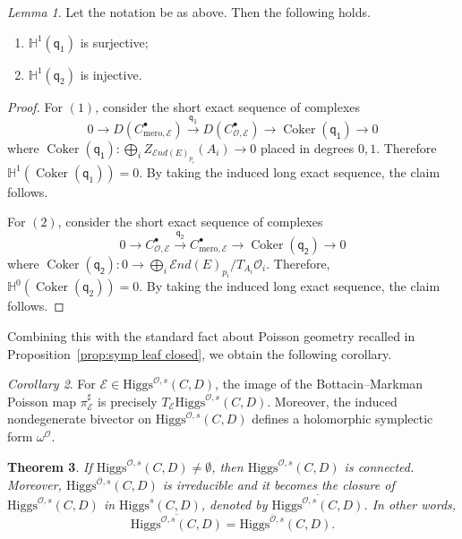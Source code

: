 \documentclass[11pt]{amsart}
\theoremstyle{plain}
\newtheorem{theorem}{Theorem}[section]
\theoremstyle{definition}
\theoremstyle{remark}
\newtheorem{lem}[theorem]{Lemma}
\newtheorem{corollary}[theorem]{Corollary}
\newcommand{\End}{\mathcal E nd}
\newcommand{\Coker}{\operatorname{Coker}}
\newcommand{\HH}{\mathbb H}
\newcommand{\ov}[1]{\overline{#1}}
\newcommand{\cO}{\mathcal O}
\newcommand{\Higgs}{\mathrm{Higgs}}
\begin{document}
\begin{lem}\label{lem:inj,surj,co}
    Let the notation be as above. Then the following holds. 
    \begin{enumerate}
        \item $\HH^1(\mathsf{q}_1)$ is surjective;
        \item $\HH^1(\mathsf{q}_2)$ is injective. 
    \end{enumerate}
\end{lem}
\begin{proof}
    For $(1)$, consider the short exact sequence of complexes
    \[
    0 \to D(C_{\text{mero}, \mathcal{E}}^\bullet) \xrightarrow{\mathsf{q_1}}  D(C_{\cO, \mathcal{E}}^\bullet) \to \Coker(\mathsf{q_1}) \to 0
    \]
    where $\Coker(\mathsf{q_1}):\bigoplus_i Z_{\End(E)_{p_i}}(A_i)\to 0$ placed in degrees $0,1$. Therefore $\mathbb{H}^1(\Coker(\mathsf{q}_1))=0$. By taking the induced long exact sequence, the claim follows. 

    For $(2)$, consider the short exact sequence of complexes
    \[
    0 \to C_{\cO, \mathcal{E}}^\bullet \xrightarrow{\mathsf{q_2}}  C_{\text{mero}, \mathcal{E}}^\bullet \to \Coker(\mathsf{q_2}) \to 0
    \]
    where $\Coker(\mathsf{q_2}): 0\to  \bigoplus_i \End(E)_{p_i}/T_{A_i}\cO_i$. Therefore, $\mathbb{H}^0(\Coker(\mathsf{q}_2))=0$. By taking the induced long exact sequence, the claim follows. 
\end{proof}
Combining this with the standard fact about Poisson geometry recalled in
 Proposition~\ref{prop:symp leaf closed}, we obtain the following corollary. 
\begin{corollary}\label{cor:characteristic-distribution}
For $\mathcal{E}\in \Higgs^{\cO,s}(C,D)$, the image of the Bottacin--Markman Poisson map $\pi^\sharp_{\mathcal{E}}$ is precisely $T_{\mathcal E}\Higgs^{\mathcal O,s}(C,D)$. Moreover, the induced nondegenerate bivector on $\Higgs^{\mathcal O,s}(C,D)$
defines a holomorphic symplectic form $\omega^{\mathcal O}$.
\end{corollary}


\begin{theorem}\label{thm:connected HiggsO}
	If $\Higgs^{\cO,s}(C,D)\neq\emptyset$, then $\Higgs^{\cO,s}(C,D)$ is connected. Moreover, $\Higgs^{\ov\cO,s}(C,D)$ is irreducible and it becomes the closure of $\Higgs^{\cO,s}(C,D)$ in $\Higgs^s(C,D)$, denoted by $\overline{\Higgs^{\cO,s}(C,D)}$. In other words, 
	\[
	\overline{\Higgs^{\cO,s}(C,D)}
	=
	\Higgs^{\ov\cO,s}(C,D).
	\]
\end{theorem}
\end{document}
